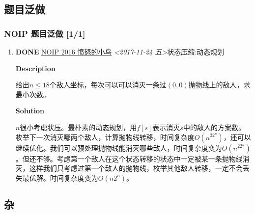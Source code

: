 \documentclass[11pt]{article}
\begin{document}
\subsection{题目泛做}
\label{sec:orgef21313}
\subsubsection{NOIP 题目泛做 [1/1]}
\label{sec:orgacff8be}
\begin{enumerate}
\item {\bfseries\sffamily DONE} \href{https://www.luogu.org/problemnew/show/2831}{NOIP 2016 愤怒的小鸟} \textit{<2017-11-24 五>}\hfill{}\textsc{状态压缩:动态规划}
\label{sec:org04c99ae}

\textbf{Description}

给出\(n \leq 18\)个敌人坐标，每次可以可以消灭一条过\((0,0)\)抛物线上的敌人，求最小次数。

\textbf{Solution}

\(n\)很小考虑状压。最朴素的动态规划，用\(f[s]\)表示消灭\(s\)中的敌人的方案数。枚举下一次消灭哪两个敌人，计算抛物线转移，时间复杂度\(O(n^32^n)\)，还可以继续优化。我们可以预处理抛物线能消灭哪些敌人，时间复杂度变为\(O(n^22^n)\)。但还不够。考虑第一个敌人在这个状态转移的状态中一定被某一条抛物线消灭，这样我们只考虑过第一个敌人的抛物线，枚举其他敌人转移，一定不会丢失最优解。时间复杂度变为\(O(n2^n)\)。
\end{enumerate}

\subsection{杂}
\label{sec:orgc513feb}
\end{document}
